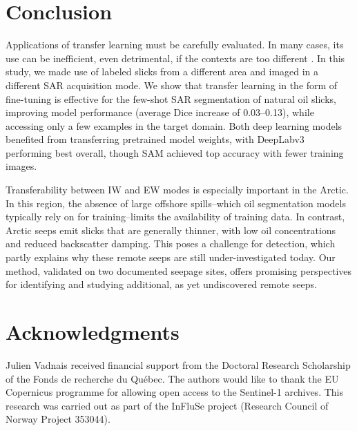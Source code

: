\documentclass[lettersize,journal]{IEEEtran}
\begin{document}
\section{Conclusion}
Applications of transfer learning must be carefully evaluated. In many cases, its use can be inefficient, even detrimental, if the contexts are too different \cite{mensinkFactorsInfluenceTransfer2022}.
In this study, we made use of labeled slicks from a different area and imaged in a different SAR acquisition mode. We show that transfer learning in the form of fine-tuning is effective for the few-shot SAR segmentation
of natural oil slicks, improving model performance (average Dice increase of 0.03--0.13), while accessing only a few examples in the target domain. 
Both deep learning models benefited from transferring pretrained model weights, 
with DeepLabv3 performing best overall, though SAM achieved top accuracy with fewer training images.

Transferability between IW and EW modes is especially important in the Arctic. In this region, the absence of large offshore spills--which oil segmentation models typically
rely on for training--limits the availability of training data. In contrast, Arctic seeps emit slicks that are generally thinner, with low oil concentrations and reduced backscatter damping.
This poses a challenge for detection, which partly explains why these remote seeps are still under-investigated today. Our method, validated on two documented seepage sites, offers promising perspectives for
identifying and studying additional, as yet undiscovered remote seeps.

\section*{Acknowledgments}
Julien Vadnais received financial support from the Doctoral Research Scholarship of the Fonds de recherche du Québec. 
The authors would like to thank the EU Copernicus programme for allowing open access to the Sentinel-1 archives.
This research was carried out as part of the InFluSe project (Research Council of Norway Project 353044).


\end{document}

